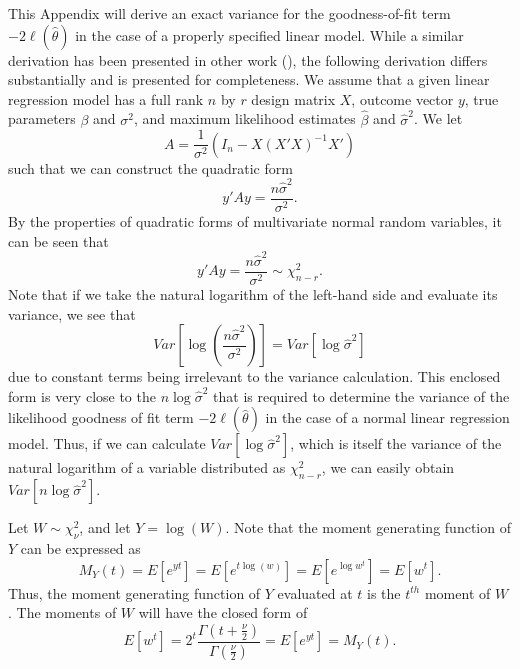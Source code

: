 \documentclass[12pt]{article} %
\theoremstyle{definition}
\begin{document}
This Appendix will derive an exact variance for the goodness-of-fit term $-2 \ell (\hat{\theta} )$ in the case of a properly specified
linear model. While a similar derivation has been presented in other work (\cite{McQuarrie}), the following derivation differs substantially and is presented for completeness.
We assume that a given linear regression model has a full rank $n$ by $r$ design matrix $X$, outcome vector $y$, true parameters $\beta$ and $\sigma^2$,
and maximum likelihood estimates $\hat{\beta}$ and $\hat{\sigma}^2$. We let
\begin{equation*}
	A = \frac{1}{\sigma^2} (I_n - X(X'X)^{-1}X') 
\end{equation*}
such that we can construct the quadratic form
\begin{equation*}
	y'Ay = \frac{n \hat{\sigma}^2}{\sigma^2} .
\end{equation*}
By the properties of quadratic forms of multivariate normal random variables, it can be seen that
\begin{equation}
	y'Ay = \frac{n \hat{\sigma}^2}{\sigma^2} \sim \chi^2_{n-r} .
\end{equation}
Note that if we take the natural logarithm of the left-hand side and evaluate its variance, we see that
\begin{equation}
	Var \left[ \log(\frac{n \hat{\sigma}^2}{\sigma^2}) \right]  = Var \left[ \log \hat{\sigma}^2 \right]
\end{equation}
due to constant terms being irrelevant to the variance calculation. This enclosed form is very close to the $n \log \hat{\sigma}^2$ that is required
to determine the variance of the likelihood goodness of fit term $-2 \ell (\hat{\theta} )$ in the case of a normal linear regression model.
Thus, if we can calculate $Var \left[ \log \hat{\sigma}^2 \right]$, which is itself the variance
of the natural logarithm of a variable distributed as $\chi^2_{n-r}$, we can easily obtain $Var \left[ n \log \hat{\sigma}^2 \right]$.

Let $W \sim \chi^2_{\nu}$, and let $Y = \log(W)$. Note that the moment generating function of $Y$ can be expressed as
\begin{equation*}
	M_Y (t) = E \left[ e^{yt} \right] = E \left[ e^{t\log(w)} \right] = E \left[ e^{\log w^t} \right] = E \left[ w^t \right] .
\end{equation*}
Thus, the moment generating function of $Y$ evaluated at $t$ is the $t^{th}$ moment of $W$. The moments of $W$ will have the
closed form of
\begin{equation*}
	E \left[ w^t \right] = 2^t \frac{\Gamma (t + \frac{\nu}{2})}{\Gamma (\frac{\nu}{2})} = E \left[ e^{yt} \right] = M_Y (t) .
\end{equation*}
\end{document}
